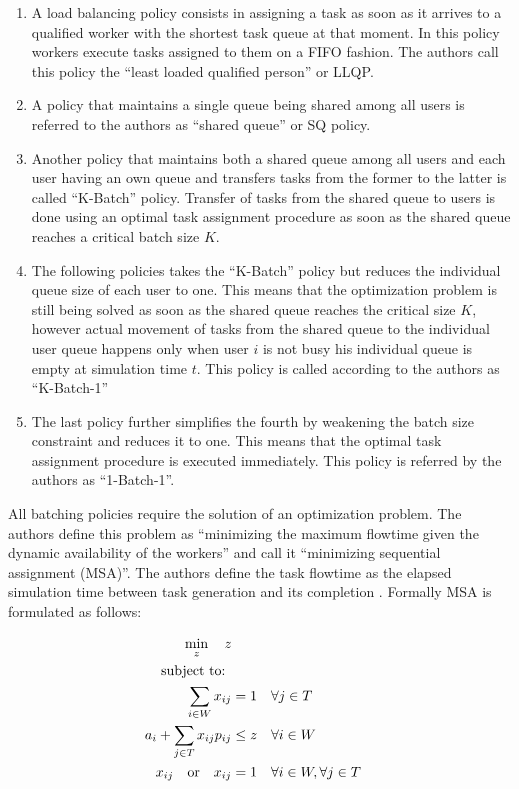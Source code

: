 \documentclass{seal_thesis}
\begin{document}
\begin{enumerate}
	\item A load balancing policy consists in assigning a task as soon as it arrives to a qualified worker with the shortest task queue at that moment. In this policy workers execute tasks assigned to them on a FIFO fashion. The authors call this policy the ``least loaded qualified person'' or LLQP.
	\item A policy that maintains a single queue being shared among all users is referred to the authors as ``shared queue'' or SQ policy.
	\item Another policy that maintains both a shared queue among all users and each user having an own queue and transfers tasks from the former to the latter is called ``K-Batch'' policy. Transfer of tasks from the shared queue to users is done using an optimal task assignment procedure as soon as the shared queue reaches a critical batch size $K$.
	\item The following policies takes the ``K-Batch'' policy but reduces the individual queue size of each user to one. This means that the optimization problem is still being solved as soon as the shared queue reaches the critical size $K$, however actual movement of tasks from the shared queue to the individual user queue happens only when user $i$ is not busy \ie his individual queue is empty at simulation time $t$. This policy is called according to the authors as ``K-Batch-1''
	\item The last policy further simplifies the fourth by weakening the batch size constraint and reduces it to one. This means that the optimal task assignment procedure is executed immediately. This policy is referred by the authors as ``1-Batch-1''.
\end{enumerate}

All batching policies require the solution of an optimization problem. The authors define this problem as ``minimizing the maximum flowtime given the dynamic availability of the workers'' and call it ``minimizing sequential assignment (MSA)''\cite[p. 7]{Zeng2005}. The authors define the task flowtime as the elapsed simulation time between task generation and its completion \cite{Zeng2005,Baker1974}. Formally MSA is formulated as follows:

\begin{align}
    \min_z \quad z\\
    \text{subject to: } \notag \\
    \sum_{i \in W} x_{ij} &= 1 \quad \forall j \in T\\
    a_i + \sum_{j \in T} x_{ij} p_{ij} &\leq z \quad \forall i \in W\\
    x_{ij} \quad \text{or} \quad x_{ij}&=1 \quad \forall i \in W, \forall j \in T
\end{align}
\end{document}
